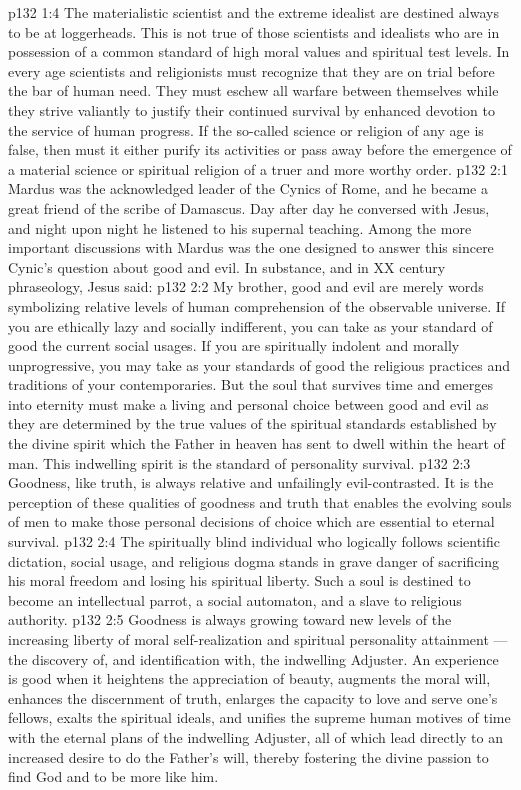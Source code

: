 \vs p132 1:4 The materialistic scientist and the extreme idealist are destined always to be at loggerheads. This is not true of those scientists and idealists who are in possession of a common standard of high moral values and spiritual test levels. In every age scientists and religionists must recognize that they are on trial before the bar of human need. They must eschew all warfare between themselves while they strive valiantly to justify their continued survival by enhanced devotion to the service of human progress. If the so\hyp{}called science or religion of any age is false, then must it either purify its activities or pass away before the emergence of a material science or spiritual religion of a truer and more worthy order.
\vs p132 2:1 Mardus was the acknowledged leader of the Cynics of Rome, and he became a great friend of the scribe of Damascus. Day after day he conversed with Jesus, and night upon night he listened to his supernal teaching. Among the more important discussions with Mardus was the one designed to answer this sincere Cynic’s question about good and evil. In substance, and in XX century phraseology, Jesus said:
\vs p132 2:2 \pc My brother, good and evil are merely words symbolizing relative levels of human comprehension of the observable universe. If you are ethically lazy and socially indifferent, you can take as your standard of good the current social usages. If you are spiritually indolent and morally unprogressive, you may take as your standards of good the religious practices and traditions of your contemporaries. But the soul that survives time and emerges into eternity must make a living and personal choice between good and evil as they are determined by the true values of the spiritual standards established by the divine spirit which the Father in heaven has sent to dwell within the heart of man. This indwelling spirit is the standard of personality survival.
\vs p132 2:3 Goodness, like truth, is always relative and unfailingly evil\hyp{}contrasted. It is the perception of these qualities of goodness and truth that enables the evolving souls of men to make those personal decisions of choice which are essential to eternal survival.
\vs p132 2:4 The spiritually blind individual who logically follows scientific dictation, social usage, and religious dogma stands in grave danger of sacrificing his moral freedom and losing his spiritual liberty. Such a soul is destined to become an intellectual parrot, a social automaton, and a slave to religious authority.
\vs p132 2:5 Goodness is always growing toward new levels of the increasing liberty of moral self\hyp{}realization and spiritual personality attainment --- the discovery of, and identification with, the indwelling Adjuster. An experience is good when it heightens the appreciation of beauty, augments the moral will, enhances the discernment of truth, enlarges the capacity to love and serve one’s fellows, exalts the spiritual ideals, and unifies the supreme human motives of time with the eternal plans of the indwelling Adjuster, all of which lead directly to an increased desire to do the Father’s will, thereby fostering the divine passion to find God and to be more like him.
